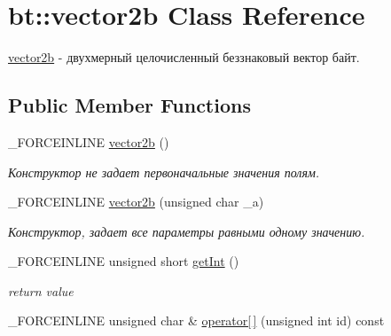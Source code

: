 \hypertarget{classbt_1_1vector2b}{\section{bt\-:\-:vector2b Class Reference}
\label{classbt_1_1vector2b}
}


\hyperlink{classbt_1_1vector2b}{vector2b} -\/ двухмерный целочисленный беззнаковый вектор байт.  


\subsection*{Public Member Functions}
\begin{DoxyCompactItemize}
\item 
\hypertarget{classbt_1_1vector2b_aaf065052e19df10e76e2907f6ed64200}{\-\_\-\-F\-O\-R\-C\-E\-I\-N\-L\-I\-N\-E \hyperlink{classbt_1_1vector2b_aaf065052e19df10e76e2907f6ed64200}{vector2b} ()}\label{classbt_1_1vector2b_aaf065052e19df10e76e2907f6ed64200}

\begin{DoxyCompactList}\small\item\em Конструктор не задает первоначальные значения полям. \end{DoxyCompactList}\item 
\hypertarget{classbt_1_1vector2b_a85968a08bd1e4e293ffaf2d766bbeba2}{\-\_\-\-F\-O\-R\-C\-E\-I\-N\-L\-I\-N\-E \hyperlink{classbt_1_1vector2b_a85968a08bd1e4e293ffaf2d766bbeba2}{vector2b} (unsigned char \-\_\-a)}\label{classbt_1_1vector2b_a85968a08bd1e4e293ffaf2d766bbeba2}

\begin{DoxyCompactList}\small\item\em Конструктор, задает все параметры равными одному значению. \end{DoxyCompactList}\item 
\hypertarget{classbt_1_1vector2b_ae96dbe3a8d81e9d4b07eca4edbd4ccc3}{\-\_\-\-F\-O\-R\-C\-E\-I\-N\-L\-I\-N\-E unsigned short \hyperlink{classbt_1_1vector2b_ae96dbe3a8d81e9d4b07eca4edbd4ccc3}{get\-Int} ()}\label{classbt_1_1vector2b_ae96dbe3a8d81e9d4b07eca4edbd4ccc3}

\begin{DoxyCompactList}\small\item\em return value \end{DoxyCompactList}\item 
\hypertarget{classbt_1_1vector2b_ab018f0dff6b3091c010c153f74af9aa8}{\-\_\-\-F\-O\-R\-C\-E\-I\-N\-L\-I\-N\-E unsigned char \& \hyperlink{classbt_1_1vector2b_ab018f0dff6b3091c010c153f74af9aa8}{operator\mbox{[}$\,$\mbox{]}} (unsigned int id) const }\label{classbt_1_1vector2b_ab018f0dff6b3091c010c153f74af9aa8}


\end{DoxyCompactItemize}
